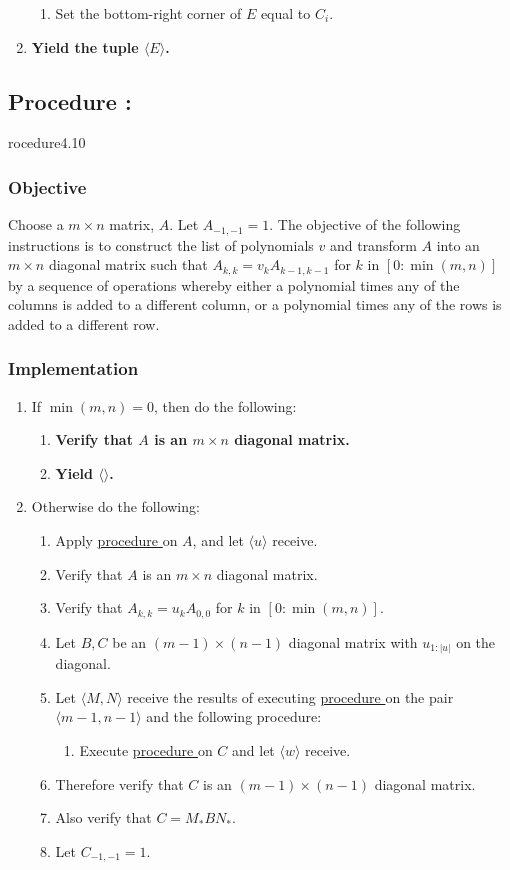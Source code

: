 \documentclass{article}
\newcounter{procedure}[part]
\newcommand{\procedure}[1]{\subsection*{Procedure \thepart:\theprocedure}\label{sec:procedure #1}\global\expandafter\edef\csname procedure#1\endcsname{\thepart:\theprocedure}\addtocounter{procedure}{1}}
\newcommand{\objective}{\subsubsection*{Objective}}
\newcommand{\implementation}{\subsubsection*{Implementation}}
\newcommand{\procedurehr}[1]{\hyperref[sec:procedure #1]{procedure \expandafter\csname procedure#1\endcsname}}
\begin{document}
\begin{multicols}{2}
\begin{enumerate}
\begin{enumerate}
					\item Set the bottom-right corner of $E$ equal to $C_i$.
				\end{enumerate}
				\item \textbf{Yield the tuple $\langle E\rangle$.}
			\end{enumerate}
		\procedure{4.10}
			\objective
				Choose a $m\times n$ matrix, $A$. Let $A_{-1,-1}=1$. The objective of the following instructions is to construct the list of polynomials $v$ and transform $A$ into an $m\times n$ diagonal matrix such that $A_{k,k}=v_kA_{k-1,k-1}$ for $k$ in $[0:\min(m,n)]$ by a sequence of operations whereby either a polynomial times any of the columns is added to a different column, or a polynomial times any of the rows is added to a different row.
			\implementation
				\begin{enumerate}
					\item If $\min(m,n)=0$, then do the following:
					\begin{enumerate}
						\item \textbf{Verify that $A$ is an $m\times n$ diagonal matrix.}
						\item \textbf{Yield $\langle\rangle$.}
					\end{enumerate}
					\item Otherwise do the following:
					\begin{enumerate}
						\item Apply \procedurehr{4.08} on $A$, and let $\langle u\rangle$ receive.
						\item Verify that $A$ is an $m\times n$ diagonal matrix.
						\item Verify that $A_{k,k}=u_{k}A_{0,0}$ for $k$ in $[0:\min(m,n)]$.
						\item Let $B,C$ be an $(m-1)\times(n-1)$ diagonal matrix with $u_{1:\lvert u\rvert}$ on the diagonal.
						\item Let $\langle M,N\rangle$ receive the results of executing \procedurehr{4.03} on the pair $\langle m-1,n-1\rangle$ and the following procedure:
						\begin{enumerate}
							\item Execute \procedurehr{4.10} on $C$ and let $\langle w\rangle$ receive.
						\end{enumerate}
						\item Therefore verify that $C$ is an $(m-1)\times(n-1)$ diagonal matrix.
						\item Also verify that $C=M_*BN_*$.
						\item Let $C_{-1,-1}=1$.

\end{enumerate}
\end{enumerate}
\end{multicols}
\end{document}
